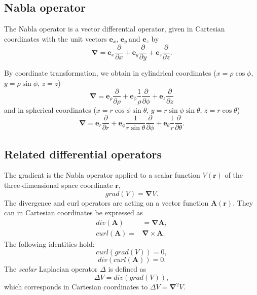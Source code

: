 \subsection{Nabla operator}

The Nabla operator is a vector differential operator, given in Cartesian
coordinates with the unit vectors $\mathbf{e}_{x}$, $\mathbf{e}_{y}\ $and
$\mathbf{e}_{z}$ by%
\[
\mathbf{\nabla}=\mathbf{e}_{x}\frac{\partial}{\partial x}+\mathbf{e}_{y}%
\frac{\partial}{\partial y}+\mathbf{e}_{z}\frac{\partial}{\partial z}.
\]

By coordinate transformation, we obtain in cylindrical coordinates
($x=\rho\cos\phi$, $y=\rho\sin\phi$, $z=z$)%
\[
{\mathbf{\nabla}=\mathbf{e}_{\rho}\frac{\partial}{\partial\rho}+\mathbf{e}%
_{\phi}\frac{1}{\rho}\frac{\partial}{\partial\phi}+\mathbf{e}_{z}%
\frac{\partial}{\partial z}}%
\]
and in spherical coordinates ($x=r\cos\phi\sin\theta$, $y=r\sin\phi\sin\theta
$, $z=r\cos\theta$)%
\[
{\mathbf{\nabla}=\mathbf{e}_{r}\frac{\partial}{\partial r}+\mathbf{e}_{\phi
}\frac{1}{r\sin\theta}\frac{\partial}{\partial\phi}+\mathbf{e}_{\theta}%
\frac{1}{r}\frac{\partial}{\partial\theta}.}%
\]

\subsection{Related differential operators}

The gradient is the Nabla operator applied to a scalar function $V(\mathbf{r}%
)$ of the three-dimensional space coordinate $\mathbf{r}$,%
\[
grad(V)=\mathbf{\nabla}V.
\]
The divergence and curl operators are acting on a vector function
$\mathbf{A}\left(  \mathbf{r}\right)  $. They can in Cartesian coordinates be
expressed as
\begin{align*}
div(\mathbf{A})  &  =\mathbf{\nabla A},\\
curl(\mathbf{A})=  &  \mathbf{\nabla}\times\mathbf{A}.
\end{align*}
The following identities hold:\newline
\begin{equation}
curl(grad\left(  V\right)  )=0, \label{eq:curlofgradient}%
\end{equation}%
\begin{equation}
div(curl(\mathbf{A}))=0. \label{eq:divergenceofcurl}%
\end{equation}
The \emph{scalar} Laplacian operator $\Delta$ is defined as
\begin{equation}
\Delta V=div(grad\left(  V\right)  ), \label{eq:divergenceofgradient}%
\end{equation}
which corresponds in Cartesian coordinates to $\Delta V=\mathbf{\nabla}^{2}V$.

